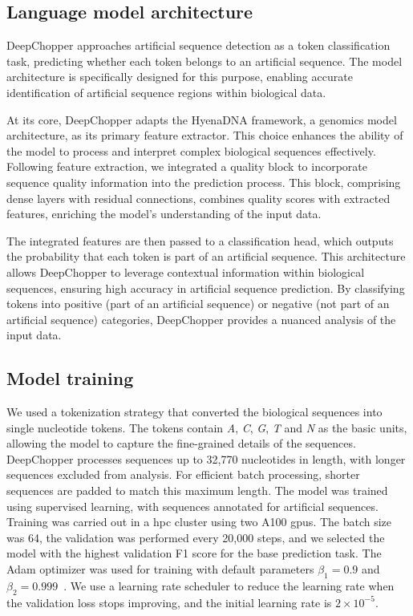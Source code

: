 \documentclass[pdflatex, sn-mathphys-num, lineno]{sn-jnl}%
\theoremstyle{thmstyleone}%
\theoremstyle{thmstyletwo}%
\theoremstyle{thmstylethree}%
\begin{document}
\subsection{Language model architecture}\label{ssec:lm}

DeepChopper approaches artificial sequence detection as a token classification task, predicting whether each token belongs to an artificial sequence.
The model architecture is specifically designed for this purpose, enabling accurate identification of artificial sequence regions within biological data.

At its core, DeepChopper adapts the HyenaDNA framework, a genomics model architecture, as its primary feature extractor.
This choice enhances the ability of the model to process and interpret complex biological sequences effectively.
Following feature extraction, we integrated a quality block to incorporate sequence quality information into the prediction process.
This block, comprising dense layers with residual connections, combines quality scores with extracted features, enriching the model's understanding of the input data.

The integrated features are then passed to a classification head, which outputs the probability that each token is part of an artificial sequence.
This architecture allows DeepChopper to leverage contextual information within biological sequences, ensuring high accuracy in artificial sequence prediction.
By classifying tokens into positive (part of an artificial sequence) or negative (not part of an artificial sequence) categories, DeepChopper provides a nuanced analysis of the input data.


\subsection{Model training}\label{ssec:training}

We used a tokenization strategy that converted the biological sequences into single nucleotide tokens.
The tokens contain \emph{A}, \emph{C}, \emph{G}, \emph{T} and \emph{N} as the basic units, allowing the model to capture the fine-grained details of the sequences.
DeepChopper processes sequences up to 32,770 nucleotides in length, with longer sequences excluded from analysis.
For efficient batch processing, shorter sequences are padded to match this maximum length.
The model was trained using supervised learning, with sequences annotated for artificial sequences.
Training was carried out in a \gls{hpc} cluster using two A100 \glspl{gpu}.
The batch size was 64, the validation was performed every 20,000 steps, and we selected the model with the highest validation F1 score for the base prediction task.
The Adam optimizer was used for training with default parameters \( \beta_{1} = 0.9 \) and \( \beta_{2} = 0.999 \)~\cite{kingma2014adam}.
We use a learning rate scheduler to reduce the learning rate when the validation loss stops improving, and the initial learning rate is \( 2 \times 10^{-5} \).
\end{document}
